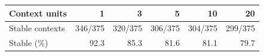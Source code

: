 \begin{tabular}{lrrrrr}
\toprule
Context units & 1 & 3 & 5 & 10 & 20 \\
\midrule
Stable contexts & 346/375 & 320/375 & 306/375 & 304/375 & 299/375 \\
Stable (\%) & 92.3 & 85.3 & 81.6 & 81.1 & 79.7 \\
\bottomrule
\end{tabular}
